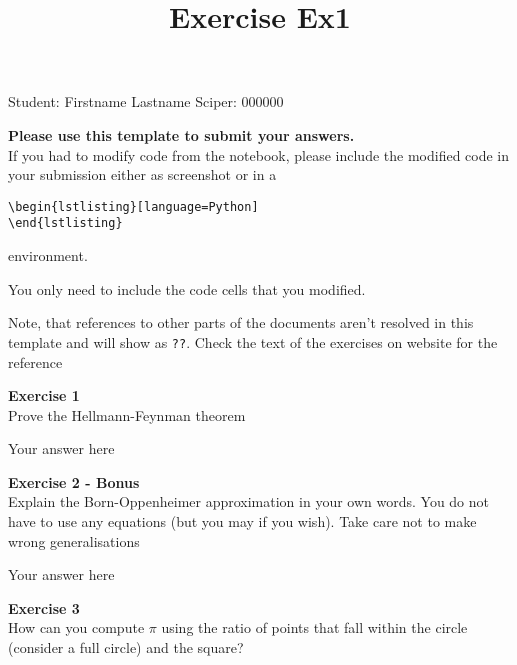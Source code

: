 \documentclass{article}
\title{Exercise Ex1}
\begin{document}
\maketitle\maketitle

Student:  Firstname Lastname    Sciper: 000000

\begin{mdframed}
\textbf{Please use this template to submit your answers.}\\
If you had to modify code from the notebook, please include the modified code in your submission either as screenshot or in a

\begin{verbatim}
\begin{lstlisting}[language=Python]
\end{lstlisting}
\end{verbatim}

environment.

You only need to include the code cells that you modified.

Note, that references to other parts of the documents aren't resolved in this template and will show as \texttt{??}. Check the text of the exercises on website for the reference
\end{mdframed}

\begin{mdframed}
\textbf{Exercise 1}\\
Prove the Hellmann-Feynman theorem
\end{mdframed}

Your answer here

\begin{mdframed}
\textbf{Exercise 2 - Bonus}\\
Explain the Born-Oppenheimer approximation in your own words.  You do not have to use any equations (but you may if you wish). Take care not to make wrong generalisations
\end{mdframed}

Your answer here

\begin{mdframed}
\textbf{Exercise 3}\\
How can you compute $\pi$ using the ratio of points that fall within the circle (consider a full circle) and the square?
\end{mdframed}
\end{document}
